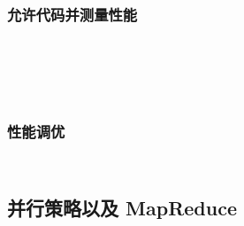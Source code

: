 \documentclass[./main.tex]{subfiles}
\begin{document}
%

\subsubsection*{允许代码并测量性能}

%

\begin{lstlisting}[language=Haskell]

\end{lstlisting}



\begin{lstlisting}[language=Haskell]

\end{lstlisting}



\begin{lstlisting}[language=Haskell]

\end{lstlisting}



\begin{lstlisting}[language=Haskell]

\end{lstlisting}



\begin{lstlisting}[language=Haskell]

\end{lstlisting}



\begin{lstlisting}[language=Haskell]

\end{lstlisting}

\subsubsection*{性能调优}

%

\begin{lstlisting}[language=Haskell]

\end{lstlisting}



\begin{lstlisting}[language=Haskell]

\end{lstlisting}

\subsection*{并行策略以及 MapReduce}
\end{document}
